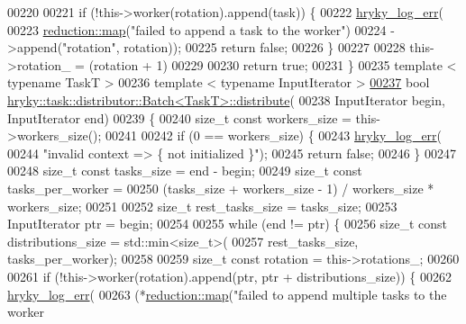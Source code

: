 \begin{DoxyCode}
00220 
00221     \textcolor{keywordflow}{if} (!this->worker(rotation).append(task)) \{
00222         \hyperlink{log__writer__common_8h_ae5ad3dabb33f594695ef40753cb78aad}{hryky_log_err}(
00223             \hyperlink{namespacehryky_1_1reduction_ac5eae270cf8047b294dc4ff3e5e11a79}{reduction::map}(\textcolor{stringliteral}{"failed to append a task to the worker"})
00224             ->append(\textcolor{stringliteral}{"rotation"}, rotation));
00225         \textcolor{keywordflow}{return} \textcolor{keyword}{false};
00226     \}
00227 
00228     this->rotation\_ = (rotation + 1) %
00229 
00230     \textcolor{keywordflow}{return} \textcolor{keyword}{true};
00231 \}
00235 \textcolor{keyword}{template} < \textcolor{keyword}{typename} TaskT >
00236 \textcolor{keyword}{template} < \textcolor{keyword}{typename} InputIterator >
\hypertarget{task__distributor__batch_8h_source_l00237}{}\hyperlink{group__task_gaf62dc1e2c3d349ecd67f459d254550fd}{00237} \textcolor{keywordtype}{bool} \hyperlink{classhryky_1_1task_1_1distributor_1_1_batch}{hryky::task::distributor::Batch<TaskT>::distribute}(
00238     InputIterator begin, InputIterator end)
00239 \{
00240     \textcolor{keywordtype}{size\_t} \textcolor{keyword}{const} workers\_size = this->workers\_size();
00241 
00242     \textcolor{keywordflow}{if} (0 == workers\_size) \{
00243         \hyperlink{log__writer__common_8h_ae5ad3dabb33f594695ef40753cb78aad}{hryky_log_err}(
00244             \textcolor{stringliteral}{"invalid context => \{ not initialized \}"});
00245         \textcolor{keywordflow}{return} \textcolor{keyword}{false};
00246     \}
00247 
00248     \textcolor{keywordtype}{size\_t} \textcolor{keyword}{const} tasks\_size = end - begin;
00249     \textcolor{keywordtype}{size\_t} \textcolor{keyword}{const} tasks\_per\_worker =
00250         (tasks\_size + workers\_size - 1) / workers\_size * workers\_size;
00251 
00252     \textcolor{keywordtype}{size\_t}          rest\_tasks\_size = tasks\_size;
00253     InputIterator   ptr = begin;
00254 
00255     \textcolor{keywordflow}{while} (end != ptr) \{
00256         \textcolor{keywordtype}{size\_t} \textcolor{keyword}{const} distributions\_size = std::min<size\_t>(
00257             rest\_tasks\_size, tasks\_per\_worker);
00258 
00259         \textcolor{keywordtype}{size\_t} \textcolor{keyword}{const} rotation = this->rotations\_;
00260 
00261         \textcolor{keywordflow}{if} (!this->worker(rotation).append(ptr, ptr + distributions\_size)) \{
00262             \hyperlink{log__writer__common_8h_ae5ad3dabb33f594695ef40753cb78aad}{hryky_log_err}(
00263                 (*\hyperlink{namespacehryky_1_1reduction_ac5eae270cf8047b294dc4ff3e5e11a79}{reduction::map}(\textcolor{stringliteral}{"failed to append multiple tasks to the worker
}
\end{DoxyCode}
